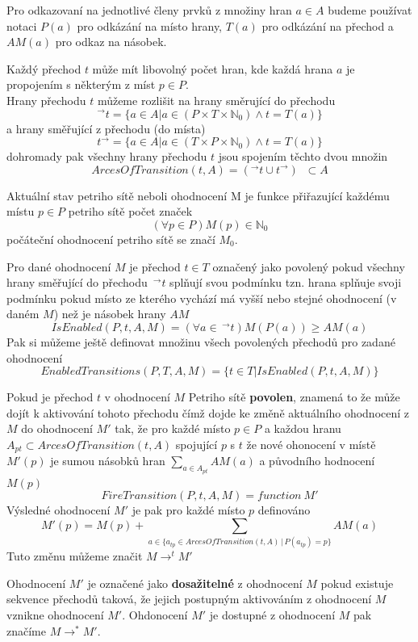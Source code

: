 \documentclass[
  biblatex,
  glossaries,
  index
]{kidiplom}
\begin{document}
Pro odkazovaní na jednotlivé členy prvků z množiny hran $a \in A$ 
budeme používat notaci $P(a)$ pro odkázání na místo hrany,
$T(a)$ pro odkázání na přechod a $AM(a)$ pro odkaz na násobek.

Každý přechod $t$ může mít  libovolný počet
hran, kde každá hrana $a$ je propojením s některým z míst $p \in P$.\\
Hrany přechodu $t$ můžeme rozlišit na hrany směrující do přechodu
$$^\to t = \{a \in A | a \in (P \times T \times \mathbb{N}_0) \land t = T(a)\}$$
a hrany směřující z přechodu (do místa)
$$ t ^\to  = \{a \in A | a \in (T \times P \times \mathbb{N}_0) \land t = T(a)\}$$
dohromady pak všechny hrany přechodu $t$ jsou spojením těchto dvou množin
$$ArcesOfTransition(t,A) = (^\to t \cup t ^\to)\;\; \subset A$$

Aktuální stav petriho sítě neboli ohodnocení M je funkce přiřazující každému
místu $p \in P$ petriho sítě počet značek
$$(\forall p \in P) M(p) \in \mathbb{N}_0$$
počáteční ohodnocení petriho sítě se značí $M_{0}$.

Pro dané ohodnocení $M$ je přechod $t \in T$ označený jako povolený
pokud všechny hrany směřující do přechodu $\,^\to t$ splňují svou podmínku tzn.
hrana splňuje svoji podmínku pokud místo ze kterého vychází má vyšší nebo stejné ohodnocení
(v daném $M$) než je násobek hrany $AM$
$$IsEnabled(P,t,A,M) = (\forall a \in \,^\to t)M(P(a)) \geq AM(a)$$
Pak si můžeme ještě definovat množinu všech povolených přechodů pro zadané ohodnocení
$$
  EnabledTransitions(P,T,A,M) =
  \{ t \in T | IsEnabled(P,t,A,M) \}
$$

Pokud je přechod $t$ v ohodnocení $M$ Petriho sítě \textbf{povolen}, znamená to že může dojít
k aktivování tohoto přechodu čímž dojde ke změně aktuálního ohodnocení z $M$ do ohodnocení $M'$
tak, že pro každé místo $p \in P$ a každou hranu $A_{pt} \subset ArcesOfTransition(t,A)$ spojující $p$ s $t$
že nové ohonocení v místě $M'(p)$ je sumou násobků hran $\sum_{a \in A_{pt}} AM(a)$ a původního hodnocení $M(p)$
$$
  FireTransition(P,t,A,M) = function\:M'
$$
Výsledné ohodnocení $M'$ je pak pro každé místo $p$ definováno
$$
  M'(p) = M(p) + \sum_{a \in \{a_{tp} \in ArcesOfTransition(t,A) \,|\, P(a_{tp}) = p \}} AM(a)
$$
Tuto změnu můžeme značit $M \to ^t M'$

Ohodnocení $M'$ je označené jako 
\textbf{dosažitelné} z ohodnocení $M$ 
pokud existuje sekvence přechodů taková, že jejich postupným 
aktivováním z ohodnocení $M$ vznikne ohodnocení $M'$.
Ohdonocení $M'$ je dostupné z ohodnocení $M$ pak značíme 
$M \to ^* M'$.
\end{document}
